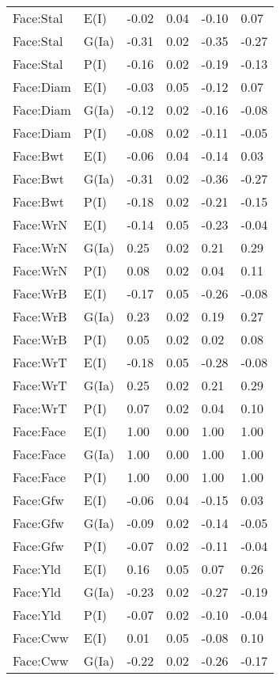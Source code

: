 \begin{center}
\begin{longtable}{|p{1.1in}|p{0.7in}|p{0.7in}|p{0.6in}|p{0.6in}|p{0.6in}|}
  Face:Stal & E(I) & -0.02 & 0.04 & -0.10 & 0.07 \\ 
  Face:Stal & G(Ia) & -0.31 & 0.02 & -0.35 & -0.27 \\ 
  Face:Stal & P(I) & -0.16 & 0.02 & -0.19 & -0.13 \\ 
  Face:Diam & E(I) & -0.03 & 0.05 & -0.12 & 0.07 \\ 
  Face:Diam & G(Ia) & -0.12 & 0.02 & -0.16 & -0.08 \\ 
  Face:Diam & P(I) & -0.08 & 0.02 & -0.11 & -0.05 \\ 
  Face:Bwt & E(I) & -0.06 & 0.04 & -0.14 & 0.03 \\ 
  Face:Bwt & G(Ia) & -0.31 & 0.02 & -0.36 & -0.27 \\ 
  Face:Bwt & P(I) & -0.18 & 0.02 & -0.21 & -0.15 \\ 
  Face:WrN & E(I) & -0.14 & 0.05 & -0.23 & -0.04 \\ 
  Face:WrN & G(Ia) & 0.25 & 0.02 & 0.21 & 0.29 \\ 
  Face:WrN & P(I) & 0.08 & 0.02 & 0.04 & 0.11 \\ 
  Face:WrB & E(I) & -0.17 & 0.05 & -0.26 & -0.08 \\ 
  Face:WrB & G(Ia) & 0.23 & 0.02 & 0.19 & 0.27 \\ 
  Face:WrB & P(I) & 0.05 & 0.02 & 0.02 & 0.08 \\ 
  Face:WrT & E(I) & -0.18 & 0.05 & -0.28 & -0.08 \\ 
  Face:WrT & G(Ia) & 0.25 & 0.02 & 0.21 & 0.29 \\ 
  Face:WrT & P(I) & 0.07 & 0.02 & 0.04 & 0.10 \\ 
  Face:Face & E(I) & 1.00 & 0.00 & 1.00 & 1.00 \\ 
  Face:Face & G(Ia) & 1.00 & 0.00 & 1.00 & 1.00 \\ 
  Face:Face & P(I) & 1.00 & 0.00 & 1.00 & 1.00 \\ 
  Face:Gfw & E(I) & -0.06 & 0.04 & -0.15 & 0.03 \\ 
  Face:Gfw & G(Ia) & -0.09 & 0.02 & -0.14 & -0.05 \\ 
  Face:Gfw & P(I) & -0.07 & 0.02 & -0.11 & -0.04 \\ 
  Face:Yld & E(I) & 0.16 & 0.05 & 0.07 & 0.26 \\ 
  Face:Yld & G(Ia) & -0.23 & 0.02 & -0.27 & -0.19 \\ 
  Face:Yld & P(I) & -0.07 & 0.02 & -0.10 & -0.04 \\ 
  Face:Cww & E(I) & 0.01 & 0.05 & -0.08 & 0.10 \\ 
  Face:Cww & G(Ia) & -0.22 & 0.02 & -0.26 & -0.17 \\ 

\end{longtable}
\end{center}
